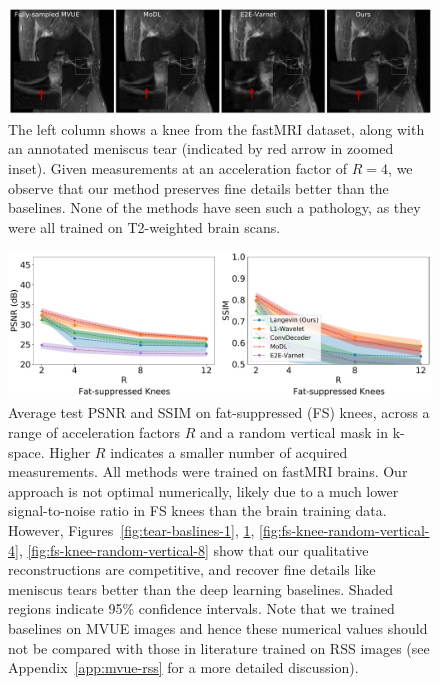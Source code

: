 \documentclass{article}
\begin{document}
\begin{figure}[t]
\begin{center}
  \includegraphics[width=\columnwidth]{meniscus_tear_case_3_annotated-comp.pdf}
\end{center}
\caption{\small The left column shows a knee from the fastMRI dataset, along with an annotated meniscus tear (indicated by red arrow in zoomed inset). Given measurements at an acceleration factor of $R=4$, we observe that our method preserves fine details better than the baselines. None of the methods have seen such a pathology, as they were all trained on T2-weighted brain scans.}
\label{fig:tear-baslines-3}
\end{figure}

\begin{figure}
    \centering
    \includegraphics[width=\columnwidth]{fs-metrics-comp.pdf}
    \caption{\small Average test PSNR and SSIM on fat-suppressed (FS) knees, across a range of acceleration factors $R$ and a random vertical mask in k-space. Higher $R$ indicates a smaller number of acquired measurements. All methods were trained on fastMRI brains. Our approach is not optimal numerically, likely due to a much lower signal-to-noise ratio in FS knees than the brain training data. However, Figures~\ref{fig:tear-baslines-1}, \ref{fig:tear-baslines-3}, \ref{fig:fs-knee-random-vertical-4}, \ref{fig:fs-knee-random-vertical-8} show that our qualitative reconstructions are competitive, and recover fine details like meniscus tears better than the deep learning baselines. Shaded regions indicate 95\% confidence intervals. Note that we trained baselines on MVUE images and hence these numerical values should not be compared with those in literature trained on RSS images (see Appendix~\ref{app:mvue-rss} for a more detailed discussion).}
    \label{fig:fs-ssim-psnr}
\end{figure}
\end{document}

